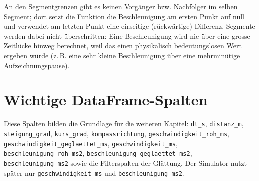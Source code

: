 An den Segmentgrenzen gibt es keinen Vorgänger bzw. Nachfolger im selben Segment; dort setzt die Funktion die Beschleunigung am ersten Punkt auf null und verwendet am letzten Punkt eine einseitige (rückwärtige) Differenz. Segmente werden dabei nicht überschritten: Eine Beschleunigung wird nie über eine grosse Zeitlücke hinweg berechnet, weil das einen physikalisch bedeutungslosen Wert ergeben würde (z.\,B. eine sehr kleine Beschleunigung über eine mehrminütige Aufzeichnungspause).

\section{Wichtige DataFrame-Spalten}

Diese Spalten bilden die Grundlage für die weiteren Kapitel:
\texttt{dt\_s}, \texttt{distanz\_m}, \texttt{steigung\_grad}, \texttt{kurs\_grad}, \texttt{kompassrichtung}, \texttt{geschwindigkeit\_roh\_ms}, \texttt{geschwindigkeit\_geglaettet\_ms}, \texttt{geschwindigkeit\_ms}, \texttt{beschleunigung\_roh\_ms2}, \texttt{beschleunigung\_geglaettet\_ms2}, \texttt{beschleunigung\_ms2} sowie die Filterspalten der Glättung. Der Simulator nutzt später nur \texttt{geschwindigkeit\_ms} und \texttt{beschleunigung\_ms2}.
